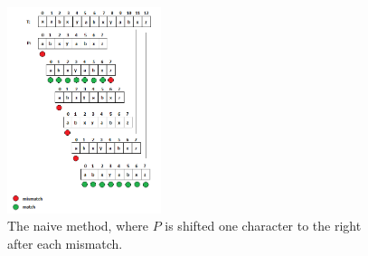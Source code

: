 \documentclass[12pt]{article} %
\begin{document}
\begin{figure}[H]
    \centering
    \includegraphics[width=0.4\textwidth]{comparisonbased1}
    \captionsetup{width=0.8\textwidth}
    \caption{The naive method, where $P$ is shifted one character to the right after each mismatch.}
    \label{fig:comparisonbased1}
\end{figure}
\end{document}
